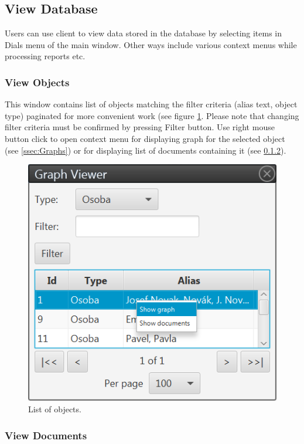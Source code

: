 \documentclass[12pt,a4paper]{report}
\begin{document}
\subsection{View Database}
\label{ssec:ViewDatabase}

Users can use client to view data stored in the database by selecting items
in Dials menu of the main window. Other ways include various context menus
while processing reports etc.

\subsubsection{View Objects}
\label{sssec:ObjectList}

This window contains list of objects matching the filter criteria (alias text,
object type) paginated for more convenient work (see figure \ref{fig:ObjectList}.
Please note that changing filter criteria must be confirmed by pressing Filter
button. Use right mouse button click to open context menu for displaying graph
for the selected object (see \ref{ssec:Graphs}) or for displaying list of documents
containing it (see \ref{sssec:DocumentList}).

\begin{figure}[!htb]
        \centering
        \includegraphics{Images/objectlist}
        \caption{List of objects.}
        \label{fig:ObjectList}
\end{figure}

\subsubsection{View Documents}
\label{sssec:DocumentList}
\end{document}
